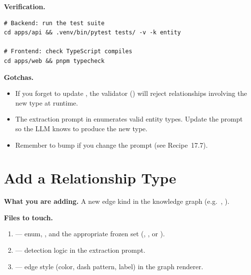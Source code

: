 \medskip\noindent\textbf{Verification.}

\begin{lstlisting}[style=bash, numbers=none]
# Backend: run the test suite
cd apps/api && .venv/bin/pytest tests/ -v -k entity

# Frontend: check TypeScript compiles
cd apps/web && pnpm typecheck
\end{lstlisting}

\medskip\noindent\textbf{Gotchas.}

\begin{itemize}
    \item If you forget to update , the
          validator () will reject
          relationships involving the new type at runtime.
    \item The extraction prompt in 
          enumerates valid entity types.  Update the prompt so the LLM
          knows to produce the new type.
    \item Remember to bump  if
          you change the prompt (see Recipe~17.7).
\end{itemize}


\section{Add a Relationship Type}
\label{sec:add-relationship-type}

\noindent\textbf{What you are adding.}
A new edge kind in the knowledge graph (e.g.\ ,
).

\medskip\noindent\textbf{Files to touch.}

\begin{enumerate}
    \item {} --- 
          enum, , and the appropriate
          frozen set (,
          , or
          ).
    \item {} --- detection logic in
          the extraction prompt.
    \item {} --- edge style (color, dash pattern, label)
          in the graph renderer.
\end{enumerate}

